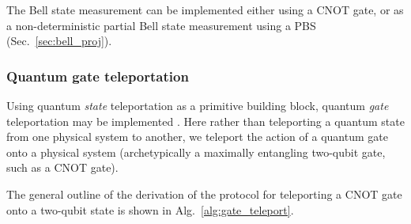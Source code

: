 \documentclass[aps,rmp,twocolumn,amsmath,amssymb,nofootinbib,superscriptaddress,longbibliography,floatfix,table-of-contents,eqsecnum]{revtex4-1}
\begin{document}
The Bell state measurement can be implemented either using a CNOT gate, or as a non-deterministic partial Bell state measurement using a PBS (Sec.~\ref{sec:bell_proj}).

%
%

\subsubsection{Quantum gate teleportation} \label{sec:teleport_gate} 

Using quantum \textit{state} teleportation as a primitive building block, quantum \textit{gate} teleportation may be implemented \cite{bib:GottesmanChuang99}. Here rather than teleporting a quantum state from one physical system to another, we teleport the action of a quantum gate onto a physical system (archetypically a maximally entangling two-qubit gate, such as a CNOT gate).

The general outline of the derivation of the protocol for teleporting a CNOT gate onto a two-qubit state is shown in Alg.~\ref{alg:gate_teleport}.
\end{document}
